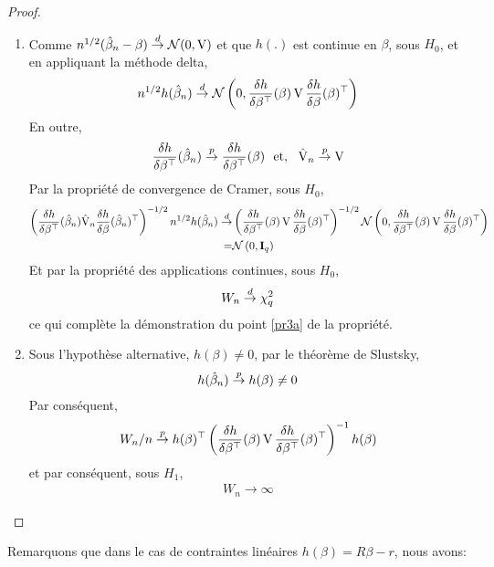 \begin{proof} 
\begin{enumerate}
\item Comme $n^{1/2}(\hat{\beta}_n- \beta) \overset{d}{\rightarrow} \mathcal{N}(0, \operatorname{V})$ et que $h(.)$ est continue en $\beta$, sous $H_0$, et en appliquant la méthode delta,
\begin{align*}
n^{1/2}h(\hat{\beta}_n) \overset{d}{\rightarrow} \mathcal{N}\left(0, \frac{\delta h}{\delta \beta^\top}(\beta) \operatorname{V} \frac{\delta h}{\delta \beta}(\beta)^\top \right)
\end{align*}
En outre,
\begin{align*}
\frac{\delta h}{\delta \beta^\top}(\hat{\beta}_n) \overset{p}{\rightarrow} \frac{\delta h}{\delta \beta^\top}(\beta) \ \ \textrm{et}, \ \ \hat{\operatorname{V}}_n \overset{p}{\rightarrow} \operatorname{V}
\end{align*}
Par la propriété de convergence de Cramer, sous $H_0$,
\begin{align*}
\left(\frac{\delta h}{\delta \beta ^ \top}(\hat{\beta}_n)\hat{\operatorname{V}}_n \frac{\delta h}{\delta \beta}(\hat{\beta}_n)^\top \right)^{-1/2}n^{1/2} h(\hat{\beta}_n) 
\overset{d}{\rightarrow} & \left(\frac{\delta h}{\delta \beta^\top}(\beta) \operatorname{V} \frac{\delta h}{\delta \beta}(\beta)^\top\right)^{-1/2} \mathcal{N}\left(0, \frac{\delta h}{\delta \beta^\top}(\beta) \operatorname{V} \frac{\delta h}{\delta \beta}(\beta)^\top\right)\\
= & \mathcal{N}\left(0, \mathbf{I}_q \right)
\end{align*}
Et par la propriété des applications continues, sous $H_0$,
\begin{align*}
W_n \overset{d}{\rightarrow} \chi^2_q
\end{align*}
ce qui complète la démonstration du point \ref{pr3a} de la propriété.
\item Sous l'hypothèse alternative, $h(\beta)\neq 0$, par le théorème de Slustsky,
\begin{align*}
h(\hat{\beta}_n)\overset{p}{\rightarrow} h(\beta) \neq 0
\end{align*}
Par conséquent, 
\begin{align*}
W_n /n \overset{p}{\rightarrow} h(\beta)^\top\left(\frac{\delta h}{\delta \beta^\top}(\beta) \operatorname{V} \frac{\delta h}{\delta \beta^\top}(\beta)^\top \right)^{-1} h(\beta)
\end{align*}
et par conséquent, sous $H_1$, 
\begin{align*}
W_n \rightarrow \infty
\end{align*}
\end{enumerate}
\end{proof}
Remarquons que dans le cas de contraintes linéaires $h(\beta) = R\beta - r$, nous avons:

